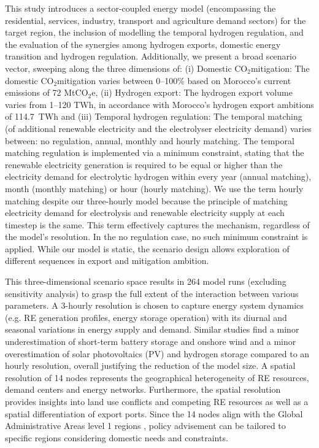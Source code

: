 \documentclass[5p,numafflabel]{elsarticle}
\newcommand{\co}{\ce{CO2}~}
\def\co{CO${}_2${\:}}
\def\coe{CO${}_2$e}
\begin{document}
This study introduces a sector-coupled energy model (encompassing the residential, services, industry, transport and agriculture demand sectors) for the target region, the inclusion of modelling the temporal hydrogen regulation, and the evaluation of the synergies among hydrogen exports, domestic energy transition and hydrogen regulation.
Additionally, we present a broad scenario vector, sweeping along the three dimensions of:
(i) Domestic \co mitigation: The domestic \co mitigation varies between 0--100\% based on Morocco's current emissions of 72 Mt\coe,
(ii) Hydrogen export: The hydrogen export volume varies from 1--120 TWh, in accordance with Morocco's hydrogen export ambitions of 114.7~TWh and
(iii) Temporal hydrogen regulation: The temporal matching (of additional renewable electricity and the electrolyser electricity demand) varies between: no regulation, annual, monthly and hourly matching. The temporal matching regulation is implemented via a minimum constraint, stating that the renewable electricity generation is required to be equal or higher than the electricity demand for electrolytic hydrogen within every year (annual matching), month (monthly matching) or hour (hourly matching). 
We use the term hourly matching despite our three-hourly model because the principle of matching electricity demand for electrolysis and renewable electricity supply at each timestep is the same. This term effectively captures the mechanism, regardless of the model’s resolution. In the no regulation case, no such minimum constraint is applied.
While our model is static, the scenario design allows exploration of different sequences in export and mitigation ambition.

This three-dimensional scenario space results in 264 model runs (excluding sensitivity analysis) to grasp the full extent of the interaction between various parameters.
A 3-hourly resolution is chosen to capture energy system dynamics (e.g. RE generation profiles, energy storage operation) with its diurnal and seasonal variations in energy supply and demand. Similar studies \cite{Neumann2022, Schlachtberger2018} find a minor underestimation of short-term battery storage and onshore wind and a minor overestimation of solar photovoltaics (PV) and hydrogen storage compared to an hourly resolution, overall justifying the reduction of the model size. 
A spatial resolution of 14 nodes represents the geographical heterogeneity of RE resources, demand centers and energy networks. Furthermore, the spatial resolution provides insights into land use conflicts and competing RE resources as well as a spatial differentiation of export ports. Since the 14 nodes align with the Global Administrative Areas level 1 regions \cite{gadm2022}, policy advisement can be tailored to specific regions considering domestic needs and constraints.
\end{document}
